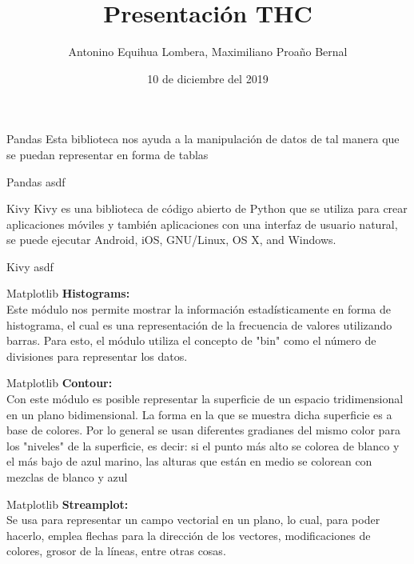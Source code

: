 \documentclass{beamer}
\title{Presentación THC}
\author{Antonino Equihua Lombera, Maximiliano Proaño Bernal}
\date{10 de diciembre del 2019}
\institute{Facultad de Ciencias, UNAM}
\begin{document}
\begin{frame}[plain]
    \maketitle
\end{frame}
\begin{frame}{Pandas}
	Esta biblioteca nos ayuda a la manipulación de datos de tal manera que se puedan representar en forma de tablas
\end{frame}

\begin{frame}{Pandas}
	asdf
\end{frame}

\begin{frame}{Kivy}
	Kivy es una biblioteca de código abierto de Python que se utiliza para crear aplicaciones móviles y también aplicaciones con una interfaz de usuario natural, se puede ejecutar Android, iOS, GNU/Linux, OS X, and Windows.
	
\end{frame}

\begin{frame}{Kivy}
	asdf
\end{frame}

\begin{frame}{Matplotlib}
	\textbf{Histograms:}\\ Este módulo nos permite mostrar la información estadísticamente en forma de histograma, el cual es una representación de la frecuencia de valores utilizando barras. Para esto, el módulo utiliza el concepto de "bin" como el número de divisiones para representar los datos.
	
\end{frame}

\begin{frame}{Matplotlib}
	\textbf{Contour:}\\ Con este módulo es posible representar la superficie de un espacio tridimensional en un plano bidimensional. La forma en la que se muestra dicha superficie es a base de colores. Por lo general se usan diferentes gradianes del mismo color para los "niveles" de la superficie, es decir: si el punto más alto se colorea de blanco y el más bajo de azul marino, las alturas que están en medio se colorean con mezclas de blanco y azul
\end{frame}

\begin{frame}{Matplotlib}
	\textbf{Streamplot:}\\ Se usa para representar un campo vectorial en un plano, lo cual, para poder hacerlo, emplea flechas para la dirección de los vectores, modificaciones de colores, grosor de la líneas, entre otras cosas.
\end{frame}
\end{document}
